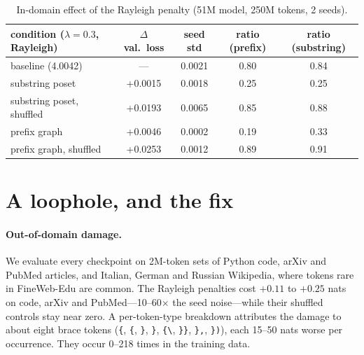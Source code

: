 \documentclass[11pt]{article}
\newcommand{\tok}[1]{\texttt{#1}}          %
\newcommand{\vsp}{\textvisiblespace}          %
\begin{document}
\begin{table}[t]
\centering
\small
\begin{tabular}{lcccc}
\toprule
condition ($\lambda=0.3$, Rayleigh) & $\Delta$ val.\ loss & seed std & ratio (prefix) & ratio (substring) \\
\midrule
baseline (4.0042)          & ---      & 0.0021 & 0.80 & 0.84 \\
substring poset            & +0.0015  & 0.0018 & 0.25 & 0.25 \\
substring poset, shuffled  & +0.0193  & 0.0065 & 0.85 & 0.88 \\
prefix graph               & +0.0046  & 0.0002 & 0.19 & 0.33 \\
prefix graph, shuffled     & +0.0253  & 0.0012 & 0.89 & 0.91 \\
\bottomrule
\end{tabular}
\caption{In-domain effect of the Rayleigh penalty (51M model, 250M tokens, 2
seeds).}
\label{tab:rayleigh}
\end{table}

\section{A loophole, and the fix}\label{sec:loophole}

\paragraph{Out-of-domain damage.} We evaluate every checkpoint on 2M-token sets of
Python code, arXiv and PubMed articles, and Italian, German and Russian Wikipedia,
where tokens rare in FineWeb-Edu are common. The Rayleigh penalties cost
$+0.11$ to $+0.25$ nats on code, arXiv and PubMed---10--60$\times$ the seed noise---while
their shuffled controls stay near zero. A per-token-type breakdown attributes the
damage to about eight brace tokens (\tok{\{}, \tok{\vsp\{}, \tok{\}}, \tok{\vsp\}},
\tok{\{\textbackslash}, \tok{\}\}}, \tok{\},}, \tok{\})}), each 15--50 nats worse per
occurrence. They occur 0--218 times in the training data.
\end{document}
